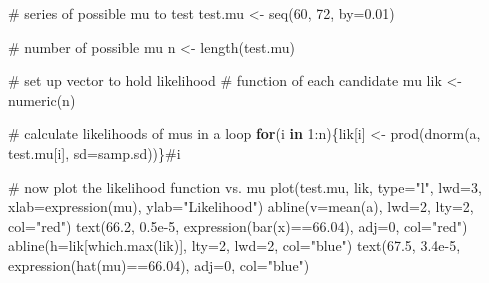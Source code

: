 \documentclass[
  13,
  letterpaper,
]{report}
\newenvironment{Shaded}{\begin{snugshade}}{\end{snugshade}}
\newcommand{\AttributeTok}[1]{\textcolor[rgb]{0.40,0.45,0.13}{#1}}
\newcommand{\CommentTok}[1]{\textcolor[rgb]{0.37,0.37,0.37}{#1}}
\newcommand{\ControlFlowTok}[1]{\textcolor[rgb]{0.00,0.23,0.31}{\textbf{#1}}}
\newcommand{\DecValTok}[1]{\textcolor[rgb]{0.68,0.00,0.00}{#1}}
\newcommand{\FloatTok}[1]{\textcolor[rgb]{0.68,0.00,0.00}{#1}}
\newcommand{\FunctionTok}[1]{\textcolor[rgb]{0.28,0.35,0.67}{#1}}
\newcommand{\NormalTok}[1]{\textcolor[rgb]{0.00,0.23,0.31}{#1}}
\newcommand{\OtherTok}[1]{\textcolor[rgb]{0.00,0.23,0.31}{#1}}
\newcommand{\SpecialCharTok}[1]{\textcolor[rgb]{0.37,0.37,0.37}{#1}}
\newcommand{\StringTok}[1]{\textcolor[rgb]{0.13,0.47,0.30}{#1}}
\begin{document}
\begin{Shaded}
\begin{Highlighting}[]
\CommentTok{\# series of possible mu to test}
\NormalTok{test.mu }\OtherTok{\textless{}{-}} \FunctionTok{seq}\NormalTok{(}\DecValTok{60}\NormalTok{, }\DecValTok{72}\NormalTok{, }\AttributeTok{by=}\FloatTok{0.01}\NormalTok{)}

\CommentTok{\# number of possible mu}
\NormalTok{n }\OtherTok{\textless{}{-}} \FunctionTok{length}\NormalTok{(test.mu)}

\CommentTok{\# set up vector to hold likelihood}
\CommentTok{\# function of each candidate mu}
\NormalTok{lik }\OtherTok{\textless{}{-}} \FunctionTok{numeric}\NormalTok{(n)}

\CommentTok{\# calculate likelihoods of mu\textquotesingle{}s in a loop}
\ControlFlowTok{for}\NormalTok{(i }\ControlFlowTok{in} \DecValTok{1}\SpecialCharTok{:}\NormalTok{n)\{lik[i] }\OtherTok{\textless{}{-}} \FunctionTok{prod}\NormalTok{(}\FunctionTok{dnorm}\NormalTok{(a, test.mu[i], }\AttributeTok{sd=}\NormalTok{samp.sd))\}}\CommentTok{\#i}

\CommentTok{\# now plot the likelihood function vs. mu}
\FunctionTok{plot}\NormalTok{(test.mu, lik, }\AttributeTok{type=}\StringTok{"l"}\NormalTok{, }\AttributeTok{lwd=}\DecValTok{3}\NormalTok{,}
     \AttributeTok{xlab=}\FunctionTok{expression}\NormalTok{(mu),}
     \AttributeTok{ylab=}\StringTok{"Likelihood"}\NormalTok{)}
\FunctionTok{abline}\NormalTok{(}\AttributeTok{v=}\FunctionTok{mean}\NormalTok{(a), }\AttributeTok{lwd=}\DecValTok{2}\NormalTok{, }\AttributeTok{lty=}\DecValTok{2}\NormalTok{, }\AttributeTok{col=}\StringTok{"red"}\NormalTok{)}
\FunctionTok{text}\NormalTok{(}\FloatTok{66.2}\NormalTok{, }\FloatTok{0.5e{-}5}\NormalTok{, }\FunctionTok{expression}\NormalTok{(}\FunctionTok{bar}\NormalTok{(x)}\SpecialCharTok{==}\FloatTok{66.04}\NormalTok{), }\AttributeTok{adj=}\DecValTok{0}\NormalTok{, }\AttributeTok{col=}\StringTok{"red"}\NormalTok{)}
\FunctionTok{abline}\NormalTok{(}\AttributeTok{h=}\NormalTok{lik[}\FunctionTok{which.max}\NormalTok{(lik)], }\AttributeTok{lty=}\DecValTok{2}\NormalTok{, }\AttributeTok{lwd=}\DecValTok{2}\NormalTok{, }\AttributeTok{col=}\StringTok{"blue"}\NormalTok{)}
\FunctionTok{text}\NormalTok{(}\FloatTok{67.5}\NormalTok{, }\FloatTok{3.4e{-}5}\NormalTok{, }\FunctionTok{expression}\NormalTok{(}\FunctionTok{hat}\NormalTok{(mu)}\SpecialCharTok{==}\FloatTok{66.04}\NormalTok{), }\AttributeTok{adj=}\DecValTok{0}\NormalTok{, }\AttributeTok{col=}\StringTok{"blue"}\NormalTok{)}
\end{Highlighting}
\end{Shaded}
\end{document}
